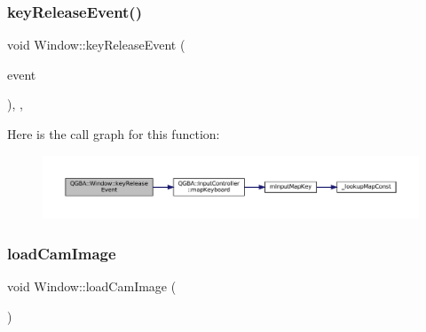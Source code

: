 \subsubsection{\texorpdfstring{key\+Release\+Event()}{keyReleaseEvent()}}
{\footnotesize\ttfamily void Window\+::key\+Release\+Event (\begin{DoxyParamCaption}\item[{Q\+Key\+Event $\ast$}]{event }\end{DoxyParamCaption})\hspace{0.3cm}{\ttfamily [override]}, {\ttfamily [protected]}, {\ttfamily [virtual]}}

Here is the call graph for this function\+:
\nopagebreak
\begin{figure}[H]
\begin{center}
\leavevmode
\includegraphics[width=350pt]{class_q_g_b_a_1_1_window_af4cac6fae4caf6d917b26a03f3a9fa5d_cgraph}
\end{center}
\end{figure}
\mbox{\label{class_q_g_b_a_1_1_window_a44460af2464844d12066bd0ad2e6c955}} 
\subsubsection{\texorpdfstring{load\+Cam\+Image}{loadCamImage}}
{\footnotesize\ttfamily void Window\+::load\+Cam\+Image (\begin{DoxyParamCaption}{ }\end{DoxyParamCaption})\hspace{0.3cm}{\ttfamily [slot]}}

